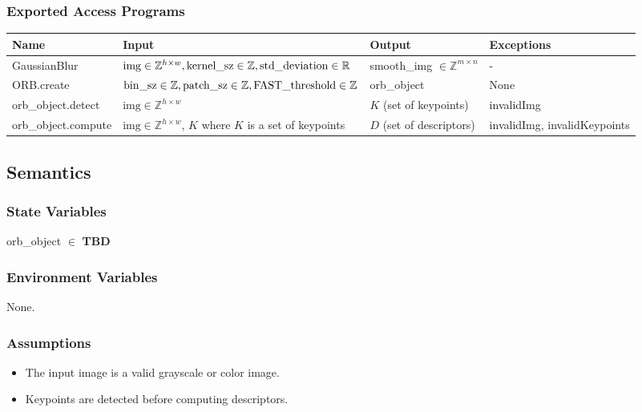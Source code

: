 \documentclass[12pt, titlepage]{article}
\begin{document}
\subsubsection{Exported Access Programs}

\begin{center}
\begin{tabular}{p{3.5cm} p{6cm} p{4.5cm} p{2cm}}
\hline
\textbf{Name} & \textbf{Input} & \textbf{Output} & \textbf{Exceptions} \\
\hline
GaussianBlur & $\text{img} \in \mathbb{Z}^{h \times w}, \newline 
\text{kernel\_sz} \in \mathbb{Z}, \newline 
\text{std\_deviation} \in \mathbb{R} $
& smooth\_img $\in \mathbb{Z}^{m\times n}$ & -\\
\hline
ORB.create & $\text{bin\_sz}\in \mathbb{Z}, \newline 
\text{patch\_sz}\in \mathbb{Z}, \newline 
\text{FAST\_threshold} \in \mathbb{Z}$ & orb\_object & None \\
\hline
orb\_object.detect & $\text{img} \in \mathbb{Z}^{h \times w}$ & $K$ (set of keypoints) & invalidImg \\
\hline
orb\_object.compute & $\text{img} \in \mathbb{Z}^{h \times w}$, \newline 
$K$ where $K$ is a set of keypoints & $D$ (set of descriptors) & invalidImg, invalidKeypoints \\
\hline
\end{tabular}
\end{center}

\subsection{Semantics}

\subsubsection{State Variables}
orb\_object $\in$ \textbf{TBD}

\subsubsection{Environment Variables}
None.

\subsubsection{Assumptions}
\begin{itemize}
    \item The input image is a valid grayscale or color image.
    \item Keypoints are detected before computing descriptors.
\end{itemize}
\end{document}
